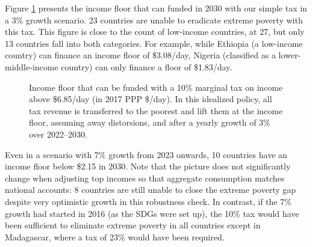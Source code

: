 Figure \ref{fig:demogrant_7__10} presents the income floor that can funded in 2030 with our simple tax in a 3\% growth scenario. 23 countries are unable to eradicate extreme poverty with this tax. This figure is close to the count of low-income countries, at 27, but only 13 countries fall into both categories.
For example, while Ethiopia (a low-income country) can finance an income floor of \$3.08/day, Nigeria (classified as a lower-middle-income country) can only finance a floor of \$1.83/day. 

\begin{figure}[t!]
  \caption[Income floor of 10\% tax above \$6.85/day in 2030 after 3\% growth.]{Income floor that can be funded with a 10\% marginal tax on income above \$6.85/day (in 2017 PPP \$/day). In this idealized policy, all tax revenue is transferred to the poorest and lift them at the income floor, assuming away distorsions, and after a yearly growth of 3\% over 2022--2030. 
  }\label{fig:demogrant_7__10}
\end{figure}

Even in a scenario with 7\% growth from 2023 onwards, 10 countries have an income floor below \$2.15 in 2030. Note that the picture does not significantly change when adjusting top incomes so that aggregate consumption matches national accounts: %
8 countries are still unable to close the extreme poverty gap despite very optimistic growth in this robustness check. In contrast, if the 7\% growth had started in 2016 (as the SDGs were set up), the 10\% tax would have been sufficient to eliminate extreme poverty in all countries except in Madagascar, where a tax of 23\% would have been required.

